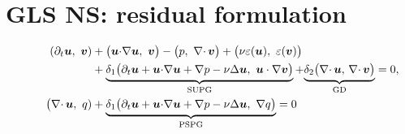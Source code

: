 \documentclass[review,onefignum,onetabnum]{siamart190516}
\begin{document}




\section{GLS NS: residual formulation}

\begin{equation}
  \begin{aligned}
    \left( \partial_t {\boldsymbol u} ,\  {\boldsymbol v} \right) 
    &+ \big( {\boldsymbol u} {\cdot} \nabla {\boldsymbol u},\ {\boldsymbol v} \big)
    - \big( p,\ \nabla{\cdot\,} {\boldsymbol v} \big) + 
    \big( \nu \varepsilon({\boldsymbol u}),\ \varepsilon({\boldsymbol v}) \big) \\
    & 
    +  
    \underbrace{\delta_1 \big( \partial_t {\boldsymbol u} + {\boldsymbol u} {\cdot} \nabla {\boldsymbol u} + \nabla p - \nu \Delta {\boldsymbol u},\ {\boldsymbol u} \cdot \nabla {\boldsymbol v} \big)}_{\text{SUPG}}  +
    {\underbrace{\delta_2 \big(\nabla{\cdot\,} {\boldsymbol u}, \, \nabla{\cdot\,} {\boldsymbol v} \big)}_{\text{GD}}}
    =0, \\
    \hspace{2.2em} 
    \big( \nabla{\cdot\,} {\boldsymbol u},\ q)&
    + \underbrace{\delta_1 \big( \partial_t {\boldsymbol u} + {\boldsymbol u} {\cdot} \nabla {\boldsymbol u} + \nabla p - \nu \Delta {\boldsymbol u},\ \nabla q \big)}_{\text{PSPG}} = 0 
  \end{aligned}
\end{equation}
\end{document}
